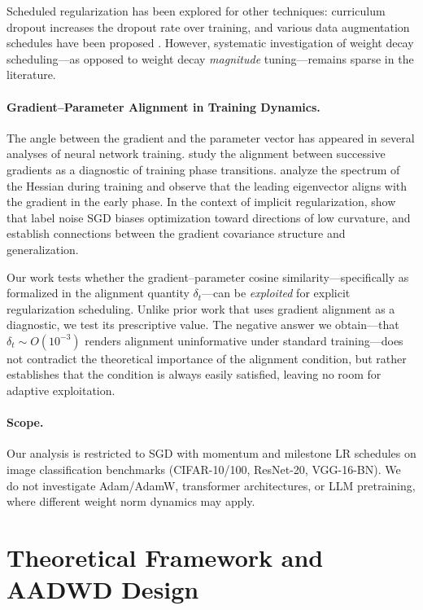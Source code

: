 \documentclass{article}
\begin{document}
Scheduled regularization has been explored for other techniques: curriculum dropout
\citep{morerio2017curriculum} increases the dropout rate over training, and various
data augmentation schedules have been proposed \citep{cubuk2020randaugment}.
However, systematic investigation of weight decay scheduling---as opposed to weight
decay \emph{magnitude} tuning---remains sparse in the literature.

\paragraph{Gradient--Parameter Alignment in Training Dynamics.}
The angle between the gradient and the parameter vector has appeared in several
analyses of neural network training.
\citet{fort2019emergent} study the alignment between successive gradients as a
diagnostic of training phase transitions.
\citet{gur2018gradient} analyze the spectrum of the Hessian during training and
observe that the leading eigenvector aligns with the gradient in the early phase.
In the context of implicit regularization, \citet{blanc2020implicit} show that label
noise SGD biases optimization toward directions of low curvature, and
\citet{li2021happens} establish connections between the gradient covariance structure
and generalization.

Our work tests whether the gradient--parameter cosine similarity---specifically as
formalized in the alignment quantity $\delta_t$---can be \emph{exploited} for
explicit regularization scheduling.
Unlike prior work that uses gradient alignment as a diagnostic, we test its
prescriptive value.
The negative answer we obtain---that $\delta_t \sim O(10^{-3})$ renders alignment
uninformative under standard training---does not contradict the theoretical importance
of the alignment condition, but rather establishes that the condition is always
easily satisfied, leaving no room for adaptive exploitation.

\paragraph{Scope.}
Our analysis is restricted to SGD with momentum and milestone LR schedules on image
classification benchmarks (CIFAR-10/100, ResNet-20, VGG-16-BN).
We do not investigate Adam/AdamW, transformer architectures, or LLM pretraining,
where different weight norm dynamics may apply.

\section{Theoretical Framework and AADWD Design}
\label{sec:theory}
\end{document}
